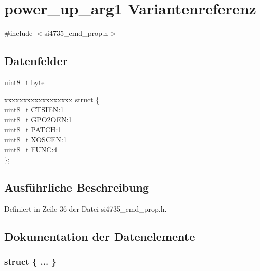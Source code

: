 \hypertarget{unionpower__up__arg1}{}\section{power\+\_\+up\+\_\+arg1 Variantenreferenz}
\label{unionpower__up__arg1}


{\ttfamily \#include $<$si4735\+\_\+cmd\+\_\+prop.\+h$>$}

\subsection*{Datenfelder}
\begin{DoxyCompactItemize}
\item 
uint8\+\_\+t \hyperlink{unionpower__up__arg1_a96f44d20f1dbf1c8785a7bc99a46164c}{byte}
\item 
\begin{tabbing}
xx\=xx\=xx\=xx\=xx\=xx\=xx\=xx\=xx\=\kill
struct \{\\
\>uint8\_t \hyperlink{unionpower__up__arg1_a4454e61ca41936d70ce251c7aa931f60}{CTSIEN}:1\\
\>uint8\_t \hyperlink{unionpower__up__arg1_aa16577946f684dfeeee75c5552b2cf32}{GPO2OEN}:1\\
\>uint8\_t \hyperlink{unionpower__up__arg1_aa2fc9067222815bec88b0dc6048b2956}{PATCH}:1\\
\>uint8\_t \hyperlink{unionpower__up__arg1_a56b7fb7e7e5dfc8eed9d066f71579077}{XOSCEN}:1\\
\>uint8\_t \hyperlink{unionpower__up__arg1_a0aab01836b450d01cbad756334c65fab}{FUNC}:4\\
\}; \\

\end{tabbing}\end{DoxyCompactItemize}


\subsection{Ausführliche Beschreibung}


Definiert in Zeile 36 der Datei si4735\+\_\+cmd\+\_\+prop.\+h.



\subsection{Dokumentation der Datenelemente}
\hypertarget{unionpower__up__arg1_ab3d22615500b3bd400498c7e667f8684}{}\subsubsection[{"@3}]{\setlength{\rightskip}{0pt plus 5cm}struct \{ ... \} }\label{unionpower__up__arg1_ab3d22615500b3bd400498c7e667f8684}
\hypertarget{unionpower__up__arg1_a96f44d20f1dbf1c8785a7bc99a46164c}{}
